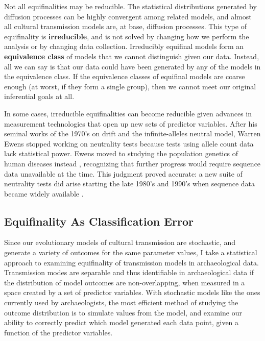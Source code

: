 Not all equifinalities may be reducible.  The statistical distributions generated by diffusion processes can be highly convergent among related models, and almost all cultural transmission models are, at base, diffusion processes. This type of equifinality is \textbf{irreducible}, and is not solved by changing how we perform the analysis or by changing data collection. Irreducibly equifinal
models form an \textbf{equivalence class} of models that we cannot
distinguish given our data. Instead, all we can say is that our data
could have been generated by any of the models in the equivalence class.  
If the equivalence classes of equifinal models are coarse enough (at worst, if they 
form a single group), then we cannot meet our original inferential goals at all. 

In some cases, irreducible equifinalities can become reducible given advances in measurement technologies that open up new sets of predictor variables.  After his seminal works of the 1970's on drift and the infinite-alleles neutral model, Warren Ewens stopped working on neutrality tests because tests using allele count data lack statistical power.  Ewens moved to studying the population genetics of human diseases instead \cite{plutinski2004}, recognizing that further progress would require sequence data unavailable at the time.  This judgment proved accurate:  a new suite of neutrality tests did arise starting the late 1980's and 1990's when sequence data became widely available \cite{fu1993statistical,tajima1989statistical}.     


\subsection{Equifinality As Classification Error}
\label{sec:equifinality-classification-error}

Since our evolutionary models of cultural transmission are stochastic, and generate a variety of outcomes for the same parameter values, I take a statistical approach to examining equifinality of transmission models in archaeological data.  Transmission modes are separable and thus identifiable in archaeological data if the distribution of model outcomes are non-overlapping, when measured in a space created by a set of predictor variables.  With stochastic models like the ones currently used by archaeologists, the most efficient method of studying the outcome distribution is to simulate values from the model, and examine our ability to correctly predict which model generated each data point, given a function of the predictor variables.  

